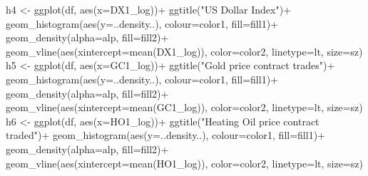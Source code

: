 \documentclass[
]{article}
\newenvironment{Shaded}{\begin{snugshade}}{\end{snugshade}}
\newcommand{\AttributeTok}[1]{\textcolor[rgb]{0.77,0.63,0.00}{#1}}
\newcommand{\FunctionTok}[1]{\textcolor[rgb]{0.00,0.00,0.00}{#1}}
\newcommand{\NormalTok}[1]{#1}
\newcommand{\OtherTok}[1]{\textcolor[rgb]{0.56,0.35,0.01}{#1}}
\newcommand{\SpecialCharTok}[1]{\textcolor[rgb]{0.00,0.00,0.00}{#1}}
\newcommand{\StringTok}[1]{\textcolor[rgb]{0.31,0.60,0.02}{#1}}
\begin{document}
\begin{Shaded}
\begin{Highlighting}[]
\NormalTok{h4 }\OtherTok{\textless{}{-}} \FunctionTok{ggplot}\NormalTok{(df, }\FunctionTok{aes}\NormalTok{(}\AttributeTok{x=}\NormalTok{DX1\_log))}\SpecialCharTok{+} \FunctionTok{ggtitle}\NormalTok{(}\StringTok{"US Dollar Index"}\NormalTok{)}\SpecialCharTok{+}
  \FunctionTok{geom\_histogram}\NormalTok{(}\FunctionTok{aes}\NormalTok{(}\AttributeTok{y=}\NormalTok{..density..), }\AttributeTok{colour=}\NormalTok{color1, }\AttributeTok{fill=}\NormalTok{fill1)}\SpecialCharTok{+}
  \FunctionTok{geom\_density}\NormalTok{(}\AttributeTok{alpha=}\NormalTok{alp, }\AttributeTok{fill=}\NormalTok{fill2)}\SpecialCharTok{+}
  \FunctionTok{geom\_vline}\NormalTok{(}\FunctionTok{aes}\NormalTok{(}\AttributeTok{xintercept=}\FunctionTok{mean}\NormalTok{(DX1\_log)), }\AttributeTok{color=}\NormalTok{color2, }\AttributeTok{linetype=}\NormalTok{lt, }\AttributeTok{size=}\NormalTok{sz)}
\NormalTok{h5 }\OtherTok{\textless{}{-}} \FunctionTok{ggplot}\NormalTok{(df, }\FunctionTok{aes}\NormalTok{(}\AttributeTok{x=}\NormalTok{GC1\_log))}\SpecialCharTok{+} \FunctionTok{ggtitle}\NormalTok{(}\StringTok{"Gold price contract trades"}\NormalTok{)}\SpecialCharTok{+}
  \FunctionTok{geom\_histogram}\NormalTok{(}\FunctionTok{aes}\NormalTok{(}\AttributeTok{y=}\NormalTok{..density..), }\AttributeTok{colour=}\NormalTok{color1, }\AttributeTok{fill=}\NormalTok{fill1)}\SpecialCharTok{+}
  \FunctionTok{geom\_density}\NormalTok{(}\AttributeTok{alpha=}\NormalTok{alp, }\AttributeTok{fill=}\NormalTok{fill2)}\SpecialCharTok{+}
  \FunctionTok{geom\_vline}\NormalTok{(}\FunctionTok{aes}\NormalTok{(}\AttributeTok{xintercept=}\FunctionTok{mean}\NormalTok{(GC1\_log)), }\AttributeTok{color=}\NormalTok{color2, }\AttributeTok{linetype=}\NormalTok{lt, }\AttributeTok{size=}\NormalTok{sz)}
\NormalTok{h6 }\OtherTok{\textless{}{-}} \FunctionTok{ggplot}\NormalTok{(df, }\FunctionTok{aes}\NormalTok{(}\AttributeTok{x=}\NormalTok{HO1\_log))}\SpecialCharTok{+} \FunctionTok{ggtitle}\NormalTok{(}\StringTok{"Heating Oil price contract traded"}\NormalTok{)}\SpecialCharTok{+}
  \FunctionTok{geom\_histogram}\NormalTok{(}\FunctionTok{aes}\NormalTok{(}\AttributeTok{y=}\NormalTok{..density..), }\AttributeTok{colour=}\NormalTok{color1, }\AttributeTok{fill=}\NormalTok{fill1)}\SpecialCharTok{+}
  \FunctionTok{geom\_density}\NormalTok{(}\AttributeTok{alpha=}\NormalTok{alp, }\AttributeTok{fill=}\NormalTok{fill2)}\SpecialCharTok{+}
  \FunctionTok{geom\_vline}\NormalTok{(}\FunctionTok{aes}\NormalTok{(}\AttributeTok{xintercept=}\FunctionTok{mean}\NormalTok{(HO1\_log)), }\AttributeTok{color=}\NormalTok{color2, }\AttributeTok{linetype=}\NormalTok{lt, }\AttributeTok{size=}\NormalTok{sz)}

\end{Highlighting}
\end{Shaded}
\end{document}

